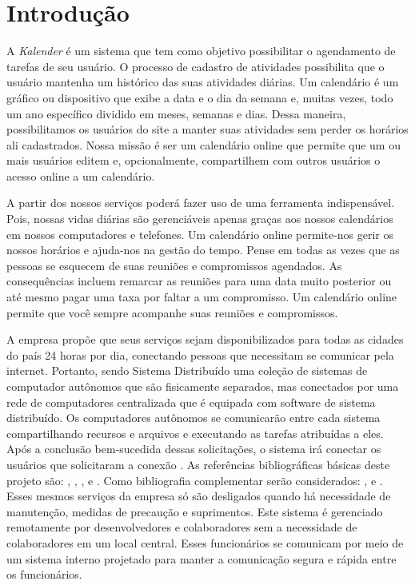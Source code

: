 

\chapter{ Introdu\c{c}\~{a}o}

A \textit{Kalender} é um sistema que tem como objetivo possibilitar o agendamento de tarefas de seu usuário. O processo de cadastro de atividades possibilita que o usuário mantenha um histórico das suas atividades diárias. Um calendário é um gráfico ou dispositivo que exibe a data e o dia da semana e, muitas vezes, todo um ano específico dividido em meses, semanas e dias. Dessa maneira, possibilitamos os usuários do site a manter suas atividades sem perder os horários ali cadastrados.
Nossa missão é ser um calendário online que permite que um ou mais usuários editem e, opcionalmente, compartilhem com outros usuários o acesso online a um calendário.

A partir dos nossos serviços poderá fazer uso de uma ferramenta indispensável. Pois, nossas vidas diárias são gerenciáveis apenas graças aos nossos calendários em nossos computadores e telefones. Um calendário online permite-nos gerir os nossos horários e ajuda-nos na gestão do tempo. Pense em todas as vezes que as pessoas se esquecem de suas reuniões e compromissos agendados. As consequências incluem remarcar as reuniões para uma data muito posterior ou até mesmo pagar uma taxa por faltar a um compromisso. Um calendário online permite que você sempre acompanhe suas reuniões e compromissos.

A empresa propõe que seus serviços sejam disponibilizados para todas as cidades do país 24 horas por dia, conectando pessoas que necessitam se comunicar pela internet. Portanto, sendo Sistema Distribuído uma coleção de sistemas de computador autônomos que são fisicamente separados, mas conectados por uma rede de computadores centralizada que é equipada com software de sistema distribuído. Os computadores autônomos se comunicarão entre cada sistema compartilhando recursos e arquivos e executando as tarefas atribuídas a eles. Após a conclusão bem-sucedida dessas solicitações, o sistema irá conectar os usuários que solicitaram a conexão \cite{devasishakula503_2022}.
As refer\^{e}ncias bibliogr\'{a}ficas b\'{a}sicas deste projeto s\~{a}o: \cite{Dennis2014}, \cite{Engholm2013}, \cite{Guedes2011},  \cite{Sommerville2018} e \cite{Wazlawick2011}. Como bibliografia complementar ser\~{a}o considerados: \cite{Satzinger2012}, \cite{Shelly2012} e  \cite{Furgeri2013}.
Esses mesmos serviços da empresa só são desligados quando há necessidade de manutenção, medidas de precaução e suprimentos. Este sistema é gerenciado remotamente por desenvolvedores e colaboradores sem a necessidade de colaboradores em um local central. Esses funcionários se comunicam por meio de um sistema interno projetado para manter a comunicação segura e rápida entre os funcionários.

